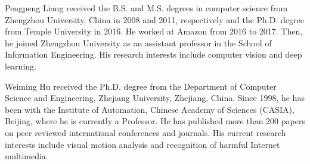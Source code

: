 \documentclass[journal]{IEEEtran}
\begin{document}
\begin{IEEEbiography}
{Pengpeng Liang}
received the B.S. and M.S. degrees in computer science from Zhengzhou University, China in 2008 and 2011, respectively and the Ph.D. degree from Temple University in 2016. He worked at Amazon from 2016 to 2017. Then, he joined Zhengzhou University as an assistant professor in the School of Information Engineering. His research interests include computer vision and deep learning.
\end{IEEEbiography}
\vspace{-5mm}

\begin{IEEEbiography}
{Weiming Hu}
received the Ph.D. degree from the Department of Computer Science and Engineering, Zhejiang University, Zhejiang, China. Since 1998, he has been with the Institute of Automation, Chinese Academy of Sciences (CASIA), Beijing, where he is currently a Professor. He has published more than 200 papers on peer reviewed international conferences and journals. His current research interests include visual motion analysis and recognition of harmful Internet multimedia.
\end{IEEEbiography}
\end{document}
